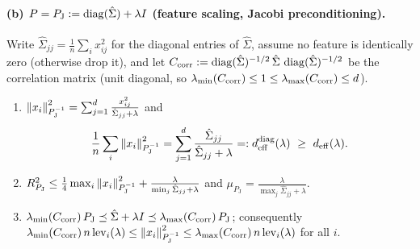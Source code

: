 \paragraph{(b) $P=P_{\mathrm J}:=\operatorname{diag}(\hat\Sigma)+\lambda I$ (feature scaling, Jacobi preconditioning).}
Write $\hat\Sigma_{jj}=\frac1n\sum_ix_{ij}^2$ for the diagonal entries of $\hat\Sigma$, assume no feature is
identically zero (otherwise drop it), and let
$C_{\mathrm{corr}}:=\operatorname{diag}(\hat\Sigma)^{-1/2}\,\hat\Sigma\,\operatorname{diag}(\hat\Sigma)^{-1/2}$ be the correlation matrix
(unit diagonal, so $\lambda_{\min}(C_{\mathrm{corr}})\le1\le\lambda_{\max}(C_{\mathrm{corr}})\le d$).
\begin{proposition}\label{prop:B1-diag}
\begin{enumerate}[label=(\roman*)]
\item $\left\|x_i\right\|_{P_{\mathrm J}^{-1}}^2=\sum_{j=1}^d\frac{x_{ij}^2}{\hat\Sigma_{jj}+\lambda}$ and
\[
\frac1n\sum_i\left\|x_i\right\|_{P_{\mathrm J}^{-1}}^2=\sum_{j=1}^d\frac{\hat\Sigma_{jj}}{\hat\Sigma_{jj}+\lambda}=:d^{\operatorname{diag}}_{\mathrm{eff}}(\lambda)
\ \ge\ d_{\mathrm{eff}}(\lambda).
\]
\item $R_{P_{\mathrm J}}^2\le\frac14\max_i\left\|x_i\right\|_{P_{\mathrm J}^{-1}}^2+\frac{\lambda}{\min_j\hat\Sigma_{jj}+\lambda}$ and
$\mu_{P_{\mathrm J}}=\frac{\lambda}{\max_j\hat\Sigma_{jj}+\lambda}$.
\item $\lambda_{\min}(C_{\mathrm{corr}})\,P_{\mathrm J}\preceq\hat\Sigma+\lambda I\preceq\lambda_{\max}(C_{\mathrm{corr}})\,P_{\mathrm J}$;
consequently $\lambda_{\min}(C_{\mathrm{corr}})\,n\,\mathrm{lev}_i(\lambda)\le\left\|x_i\right\|_{P_{\mathrm J}^{-1}}^2
\le\lambda_{\max}(C_{\mathrm{corr}})\,n\,\mathrm{lev}_i(\lambda)$ for all $i$.
\end{enumerate}
\end{proposition}
